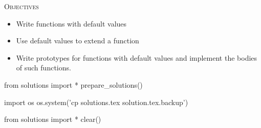 
\textsc{Objectives}
\begin{itemize}
\item Write functions with default values
\item Use default values to extend a function
\item Write prototypes for functions with default values and implement the bodies of such functions.
\end{itemize}







\begin{python0}
from solutions import *
prepare_solutions()
\end{python0}
\begin{python}
import os
os.system('cp solutions.tex solution.tex.backup')  
\end{python}

\begin{python0}
from solutions import *
clear()
\end{python0}
